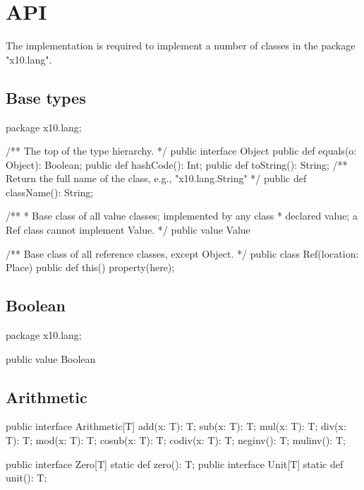 \chapter{API}\label{XtenAPI}

The \Xten{} implementation is required to implement a number of
classes in the package \xcd"x10.lang".

\section{Base types}

\begin{xten}
package x10.lang;

/** The top of the type hierarchy. */
public interface Object {
    public def equals(o: Object): Boolean;
    public def hashCode(): Int;
    public def toString(): String;
    /** Return the full name of the class, e.g., "x10.lang.String" */
    public def className(): String;
}

/**
 * Base class of all value classes; implemented by any class
 * declared value; a Ref class cannot implement Value.
 */
public value Value { }

/** Base class of all reference classes, except Object. */
public class Ref(location: Place) {
    public def this() { property(here); }
}
\end{xten}

\section{Boolean}

\begin{xten}
package x10.lang;

public value Boolean { }
\end{xten}

\section{Arithmetic}

\begin{xten}
public interface Arithmetic[T] {
    add(x: T): T;
    sub(x: T): T;
    mul(x: T): T;
    div(x: T): T;
    mod(x: T): T;
    cosub(x: T): T;
    codiv(x: T): T;
    neginv(): T;
    mulinv(): T;
}

public interface Zero[T] { static def zero(): T; }
public interface Unit[T] { static def unit(): T; }
\end{xten}


